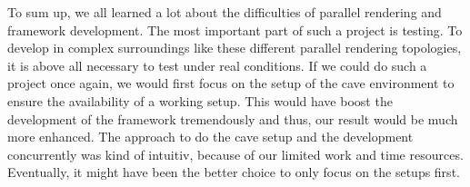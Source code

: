 To sum up, we all learned a lot about the difficulties of parallel rendering and framework development. The most important part of such a project is testing. To develop in complex surroundings like these different parallel rendering topologies, it is above all necessary to test under real conditions. If we could do such a project once again, we would first focus on the setup of the \gls{cave} environment to ensure the availability of a working setup. This would have boost the development of the framework tremendously and thus, our result would be much more enhanced. The approach to do the \gls{cave} setup and the development concurrently was kind of intuitiv, because of our limited work and time resources. Eventually, it might have been the better choice to only focus on the setups first.

